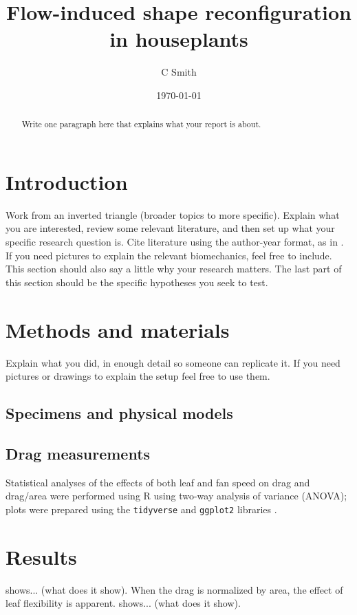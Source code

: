 \documentclass{article}
\title{Flow-induced shape reconfiguration in houseplants}
\author{C Smith}
\date{\today}
\begin{document}
\maketitle
\begin{abstract}
Write one paragraph here that explains what your report is about.
\end{abstract}

\section{Introduction}
Work from an inverted triangle (broader topics to more specific). Explain what you are interested, review some relevant literature, and then set up what your specific research question is. Cite literature using the author-year format, as in \citep{buck2020go}. If you need pictures to explain the relevant biomechanics, feel free to include. This section should also say a little why your research matters. 
The last part of this section should be the specific hypotheses you seek to test. 

\section{Methods and materials}
Explain what you did, in enough detail so someone can replicate it. If you need pictures or drawings to explain the setup feel free to use them. 

\subsection{Specimens and physical models}
\subsection{Drag measurements}
Statistical analyses of the effects of both leaf and fan speed on drag and drag/area were performed using R \citep{r2020} using two-way analysis of variance (ANOVA); plots were prepared using the \lstinline{tidyverse} and \lstinline{ggplot2} libraries \citep{wickham2019tidyverse}. 

\section{Results}
 shows... (what does it show). When the drag is normalized by area, the effect of leaf flexibility is apparent.  shows... (what does it show). 
\end{document}
